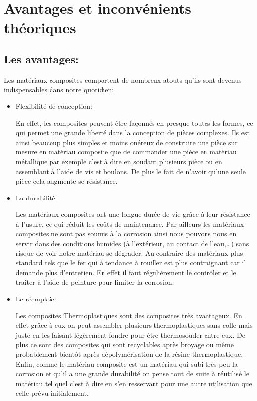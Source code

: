 \chapter{Avantages et inconvénients théoriques}


\section{Les avantages:}

Les matériaux composites comportent de nombreux atouts qu’ils sont devenus indispensables dans notre quotidien:


\begin{itemize}

    \item
    Flexibilité de conception:


    En effet, les composites peuvent être façonnés en presque toutes les formes, ce qui permet une grande liberté dans la conception de pièces complexes.
    Ils est ainsi beaucoup plus simples et moins onéreux de construire une pièce sur mesure en matériau composite que de commander une pièce en matériau métallique par exemple c’est à dire en soudant plusieurs pièce ou en assemblant à l’aide de vis et boulons.
    De plus le fait de n’avoir qu’une seule pièce cela augmente se résistance.




    \item
    La durabilité:


    Les matériaux composites ont une longue durée de vie grâce à leur résistance à l’usure, ce qui réduit les coûts de maintenance.
    Par ailleurs les matériaux composites ne sont pas soumis à la corrosion ainsi nous pouvons nous en servir dans des conditions humides (à l’extérieur, au contact de l’eau,…) sans risque de voir notre matériau se dégrader.
    Au contraire des matériaux plus standard tels que le fer qui à tendance à rouiller est plus contraignant car il demande plus d’entretien.
    En effet il faut régulièrement le contrôler et le traiter à l’aide de peinture pour limiter la corrosion.




    \item
    Le réemploie:


    Les composites Thermoplastiques sont des composites très avantageux.
    En effet grâce à eux on peut assembler plusieurs thermoplastiques sans colle mais juste en les faisant légèrement fondre pour être thermosouder entre eux.
    De plus ce sont des composites qui sont recyclables après broyage ou même probablement bientôt après dépolymérisation de la résine thermoplastique.
    Enfin, comme le matériau composite est un matériau qui subi très peu la corrosion et qu’il a une grande durabilité on pense tout de suite à réutilisé le matériau tel quel c’est à dire en s’en resservant pour une autre utilisation que celle prévu initialement.


\end{itemize}


